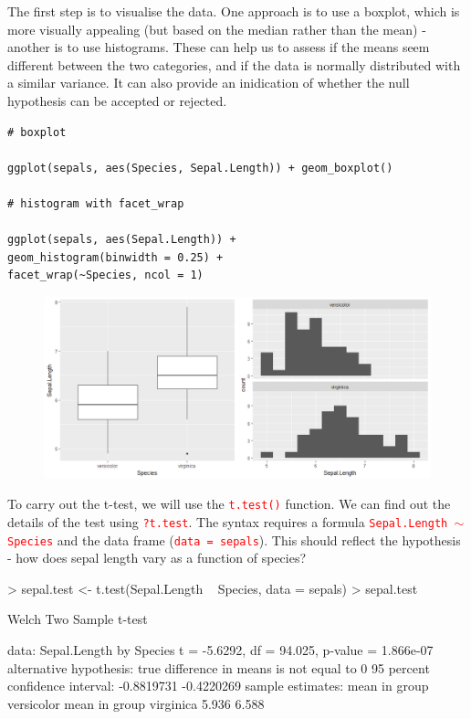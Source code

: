 \documentclass[a4paper,12pt]{article}
\newcommand\code[1]{\textcolor{red}{\texttt{#1}}}
\begin{document}
The first step is to visualise the data. One approach is to use a boxplot, which is more visually appealing (but based on the median rather than the mean) - another is to use histograms. These can help us to assess if the means seem different between the two categories, and if the data is normally distributed with a similar variance. It can also provide an inidication of whether the null hypothesis can be accepted or rejected.

\begin{shaded}
\begin{verbatim}
# boxplot

ggplot(sepals, aes(Species, Sepal.Length)) + geom_boxplot()

# histogram with facet_wrap

ggplot(sepals, aes(Sepal.Length)) + 
geom_histogram(binwidth = 0.25) + 
facet_wrap(~Species, ncol = 1)
\end{verbatim}
\end{shaded}

\begin{figure}[h]
\centering 
\includegraphics[width=1\textwidth]{figs/boxplothist.png}
\label{fig:boxplothist}
\end{figure} 


To carry out the t-test, we will use the \code{t.test()} function. We can find out the details of the test using \code{?t.test}. The syntax requires a formula \code{Sepal.Length $\sim$ Species} and the data frame (\code{data = sepals}). This should reflect the hypothesis - how does sepal length vary as a function of species? \\


\begin{shaded}
\begin{Schunk}
\begin{Sinput}
> sepal.test <- t.test(Sepal.Length ~ Species, data = sepals)
> sepal.test
\end{Sinput}
\begin{Soutput}
	Welch Two Sample t-test

data:  Sepal.Length by Species
t = -5.6292, df = 94.025, p-value = 1.866e-07
alternative hypothesis: true difference in means is not equal to 0
95 percent confidence interval:
 -0.8819731 -0.4220269
sample estimates:
mean in group versicolor  mean in group virginica 
                   5.936                    6.588 
\end{Soutput}
\end{Schunk}
\end{shaded}
\end{document}

